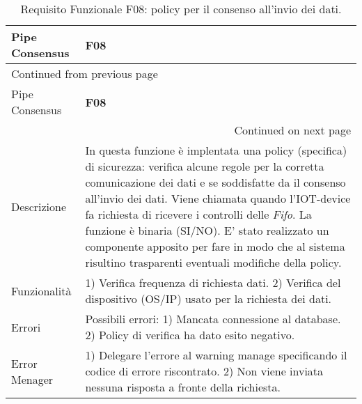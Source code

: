 \documentclass[onecolumn,a4paper]{article}
\begin{document}
\begin{longtable}{|p{3cm}|p{10cm}|}
\caption{Requisito Funzionale F08: policy per il consenso all'invio dei dati.}
\\
\cellcolor{grey!15}Pipe Consensus & \cellcolor{grey!15} \textbf{F08}\\
\hline
\endfirsthead
\multicolumn{2}{l}{Continued from previous page} \\
\hline

\cellcolor{grey!15}Pipe Consensus & \cellcolor{grey!15} \textbf{F08} \\

\hline
\endhead
\hline\multicolumn{2}{r}{Continued on next page} \\
\endfoot
\endlastfoot
\hline
Descrizione & In questa funzione è implentata una policy (specifica) di sicurezza: verifica alcune regole per la corretta comunicazione dei dati e se soddisfatte da il consenso all'invio dei dati. Viene chiamata quando l'IOT-device fa richiesta di ricevere i controlli delle \emph{Fifo}. La funzione è binaria (SI/NO). E' stato realizzato un componente apposito per fare in modo che al sistema risultino trasparenti eventuali modifiche della policy.\\
\hline
Funzionalità & 1) Verifica frequenza di richiesta dati. 2) Verifica del dispositivo (OS/IP) usato per la richiesta dei dati.\\
\hline
Errori & Possibili errori: 1) Mancata connessione al database. 2) Policy di verifica ha dato esito negativo.\\
\hline
Error Menager & 1) Delegare l'errore al warning manage specificando il codice di errore riscontrato. 2) Non viene inviata nessuna risposta a fronte della richiesta.\\
\hline
\end{longtable}
\end{document}
